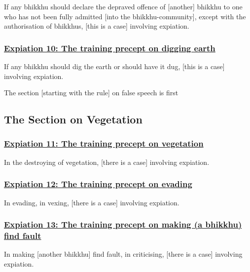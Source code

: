 If any bhikkhu should declare the depraved offence of [another] bhikkhu to one who has not been fully admitted [into the bhikkhu-community], except with the authorisation of bhikkhus, [this is a case] involving expiation.



\subsubsection*{\hyperref[pac10]{Expiation 10: The training precept on digging earth}}
\label{exp10}
If any bhikkhu should dig the earth or should have it dug, [this is a case] involving expiation.

\begin{center}
	The section [starting with the rule] on false speech is first
\end{center}



\setsubsecheadstyle{\subsectionFmt}
\subsection{The Section on Vegetation}

\subsubsection*{\hyperref[pac11]{Expiation 11: The training precept on vegetation}}
\label{exp11}
In the destroying of vegetation, [there is a case] involving expiation.



\subsubsection*{\hyperref[pac12]{Expiation 12: The training precept on evading}}
\label{exp12}
In evading, in vexing, [there is a case] involving expiation.



\subsubsection*{\hyperref[pac1]{Expiation 13: The training precept on making (a bhikkhu) find fault}}
\label{exp13}
In making [another bhikkhu] find fault, in criticising, [there is a case] involving expiation.



